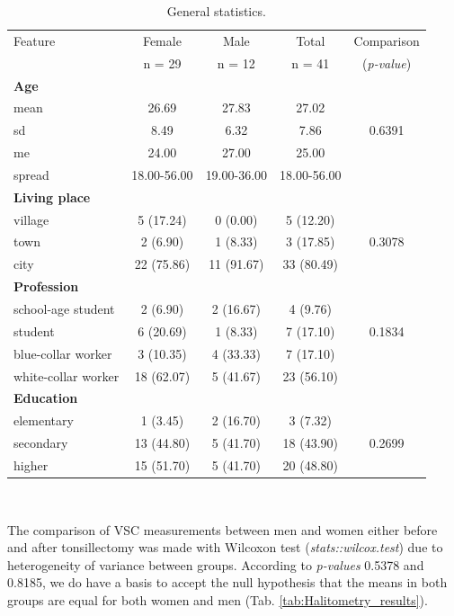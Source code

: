 \documentclass[12pt,a4paper,notitlepage]{report}
\begin{document}
\begin{table}[H]
\centering
	\begin{tabular}{lcccc}
	\hline Feature 				& Female 	& Male 		& Total 		&  Comparison \\
	 		 					& n = 29 	& n = 12	& n = 41	&  (\textit{p-value}) \\
	\hline
	\bf{Age}						&			&			&			&		\\
	\indent mean					& 26.69		& 27.83		& 27.02		& 		\\
	\indent sd					& 8.49		& 6.32		& 7.86		& 0.6391 \\
	\indent me					& 24.00		& 27.00		& 25.00		& 		\\
	\indent spread				& 18.00-56.00 & 19.00-36.00	& 18.00-56.00 & \\
	\hline
	
	\bf{Living place} 				&			&			&			&		\\
	\indent village				& 5 (17.24)	& 0 (0.00)	& 5	(12.20)	& 		\\
	\indent town					& 2 (6.90)	& 1	(8.33) 	& 3	(17.85) 	&  0.3078 \\
	\indent city					& 22 (75.86)	& 11 (91.67) & 33 (80.49) & 		\\
	\hline
	
	\bf{Profession} 				&			&			&			&		\\
	\indent school-age student		& 2 (6.90)	& 2 (16.67)	& 4	(9.76) 	& 		\\
	\indent student				& 6 (20.69)	& 1	(8.33) 	& 7	(17.10) 	& 0.1834 \\
	\indent blue-collar worker		& 3 (10.35)	& 4 (33.33) 	& 7 (17.10) 	& 		\\
	\indent white-collar worker	& 18 (62.07)	& 5 (41.67) 	& 23 (56.10) & 		\\
	\hline
	
	\bf{Education} 				&			&			&			&		\\
	\indent elementary			& 1 (3.45)	& 2 (16.70)	& 3	(7.32) 	& 		\\
	\indent secondary			& 13 (44.80)	& 5	(41.70) 	& 18 (43.90) & 0.2699 \\
	\indent higher				& 15 (51.70)	& 5 (41.70) 	& 20 (48.80) & 		\\
	\hline
	
	\end{tabular} \\ 
	\caption{General statistics.}
	\label{tab:General_stats}
\end{table}

The comparison of VSC measurements between men and women either before and after tonsillectomy was made with Wilcoxon test (\textit{stats::wilcox.test}) due to heterogeneity of variance between groups. According to \textit{p-values} 0.5378 and 0.8185,  we do have a basis to accept the null hypothesis that the means in both groups are equal for both women and men (Tab. \ref{tab:Halitometry_results}). 
\end{document}
